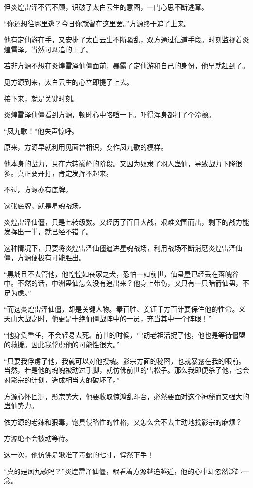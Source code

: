 \begin{this_body}
但炎煌雷泽不管不顾，识破了太白云生的意图，一门心思不断逃窜。

“你还想往哪里逃？今日你就留在这里罢。”方源终于追了上来。

他有定仙游在手，又安排了太白云生不断骚乱，双方通过信道手段。时刻监视着炎煌雷泽，当然可以追的上了。

若非方源不想在炎煌雷泽仙僵面前，暴露了定仙游和自己的身份，他早就赶到了。

见方源到来，太白云生的心立即提了上去。

接下来，就是关键时刻。

炎煌雷泽仙僵看到方源，顿时心中咯噔一下。吓得浑身都打了个冷颤。

“凤九歌！”他失声惊呼。

原来，方源早就利用见面曾相识，变作凤九歌的模样。

他本身的战力，只在六转巅峰的阶段。又因为奴隶了羽人蛊仙，导致战力下降很多。真正要开打，肯定发挥不起来。

不过，方源亦有底牌。

这张底牌，就是星魂战场。

炎煌雷泽仙僵，只是七转级数。又经历了百日大战，艰难突围而出，剩下的战力能发挥出一半，就已经不错了。

这种情况下，只要将炎煌雷泽仙僵逼进星魂战场，利用战场不断消磨炎煌雷泽仙僵，方源便极有可能胜出。

“黑城且不去管他，他惶惶如丧家之犬，恐怕一如前世，仙蛊屋已经丢在落魄谷中。不然的话，中洲蛊仙怎么没有追出来？他身上带伤，又只有一只暗箭仙蛊，不足为虑。”

“而这炎煌雷泽仙僵，却是关键人物。秦百胜、姜钰千方百计要保住他的性命。义天山大战之时，他更是十绝仙僵战阵中的一员，充当其中一个阵眼！”

“他身负重任，不会轻易去死。前世的时候，雪胡老祖活捉了他，他也是等待僵盟的救援。因此我俘虏他的可能性很大。”

“只要我俘虏了他，我就可以对他搜魂。影宗方面的秘密，也就暴露在我的眼前。当然，若是他的魂魄被动过手脚，就仿佛前世的雪松子。那么我即便杀了他，也会对影宗的计划，造成相当大的破坏了。”

方源心怀叵测，影宗势大，他要收取惊鸿乱斗台，必然要面对这个神秘而又强大的蛊仙势力。

依方源的老辣和狠毒，饱具侵略性的性格，又怎么会不去主动地找影宗的麻烦？

方源绝不会被动等待。

这一次，他仿佛是瞅准了毒蛇的七寸，悍然下手！

“真的是凤九歌吗？”炎煌雷泽仙僵，眼看着方源越追越近，他的心中却忽然泛起一念。


\end{this_body}
